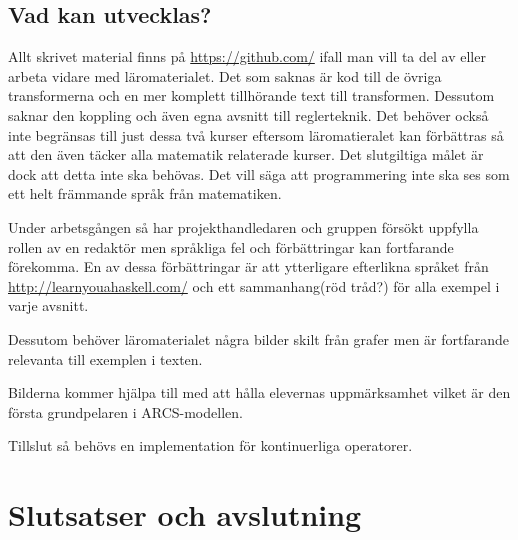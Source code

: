 \documentclass[]{article}
\begin{document}
\subsection{Vad kan utvecklas?}

Allt skrivet material finns på \url{https://github.com/} ifall man vill ta del av eller arbeta vidare med läromaterialet.
Det som saknas är kod till de övriga transformerna och en mer komplett tillhörande text till transformen. Dessutom
saknar den koppling och även egna avsnitt till reglerteknik.  Det behöver också inte begränsas till just dessa två
kurser eftersom läromatieralet kan förbättras så att den även täcker alla matematik relaterade kurser. Det slutgiltiga
målet är dock att detta inte ska behövas. Det vill säga att programmering inte ska ses som ett helt främmande språk
från matematiken.

Under arbetsgången så har projekthandledaren och gruppen försökt uppfylla rollen av en redaktör men språkliga fel och
förbättringar kan fortfarande förekomma. En av dessa förbättringar är att ytterligare efterlikna språket
från \url{http://learnyouahaskell.com/} och ett sammanhang(röd tråd?) för alla exempel i varje avsnitt. %

Dessutom behöver läromaterialet några bilder skilt från grafer men är fortfarande relevanta till exemplen i texten. %

Bilderna kommer hjälpa till med att hålla elevernas uppmärksamhet vilket är den första grundpelaren i ARCS-modellen. %

Tillslut så behövs en implementation för kontinuerliga operatorer. %


\section{Slutsatser och avslutning}
\end{document}
